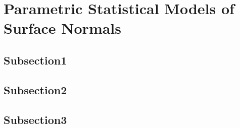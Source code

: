 \chapter{Parametric Statistical Models of Surface Normals}
\minitoc{}
\section{Subsection1}
\lipsum[1-10]
\section{Subsection2}
\lipsum[1-10]
\section{Subsection3}
\lipsum[1]
\stopcontents[chapters]
